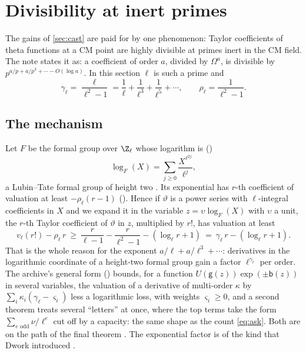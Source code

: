 \section{Divisibility at inert primes}\label{sec:divisibility}

The gains of \cref{sec:cast} are paid for by one phenomenon: Taylor coefficients of theta
functions at a CM point are highly divisible at primes inert in the CM field. The note states
it as: a coefficient of order $a$, divided by $\Omega^a$, is divisible by
$p^{a/p+a/p^3+\cdots-O(\log a)}$. In this section $\ell$ is such a prime and
\[
\gamma_\ell=\frac{\ell}{\ell^2-1}=\frac1\ell+\frac1{\ell^3}+\frac1{\ell^5}+\cdots,\qquad
\rho_\ell=\frac1{\ell^2-1}.
\]

\subsection{The mechanism}
Let $F$ be the formal group over $\Z_\ell$ whose logarithm is \lvS{} ()
\[
\log_F(X)=\sum_{j\ge0}\frac{X^{\ell^{2j}}}{\ell^{j}},
\]
a Lubin--Tate formal group of height two \cite{lubintate1965,honda1970}. Its exponential has
$r$-th coefficient of valuation at least $-\rho_\ell(r-1)$ \lvS{} (). Hence if
$\vartheta$ is a power series with $\ell$-integral coefficients in $X$ and we expand it in the
variable $z=\upsilon\log_F(X)$ with $\upsilon$ a unit, the $r$-th Taylor coefficient of
$\vartheta$ in $z$, multiplied by $r!$, has valuation at least
\[
v_\ell(r!)-\rho_\ell\,r\ \ge\ \frac{r}{\ell-1}-\frac{r}{\ell^2-1}-(\log_\ell r+1)
\ =\ \gamma_\ell\,r-(\log_\ell r+1).
\]
That is the whole reason for the exponent $a/\ell+a/\ell^3+\cdots$: derivatives in the
logarithmic coordinate of a height-two formal group gain a factor $\ell^{\gamma_\ell}$ per
order. The archive's general form \lvS{} () bounds, for a function
$U(\mathsf g(z))\exp(\pm\mathsf b(z))$
in several variables, the valuation of a derivative of multi-order $\kappa$ by
$\sum_i\kappa_i(\gamma_\ell-\varsigma_i)$ less a logarithmic loss, with weights
$\varsigma_i\ge0$, and a second theorem treats
several ``letters'' at once, where the top terms take the form $\sum_{e\text{ odd}}\nu/\ell^e$
cut off by a capacity: the same shape as the count \eqref{eq:ask}. Both are on the path of the
final theorem \lvM. The exponential factor is of the kind that Dwork introduced
\cite{dwork1960}.

